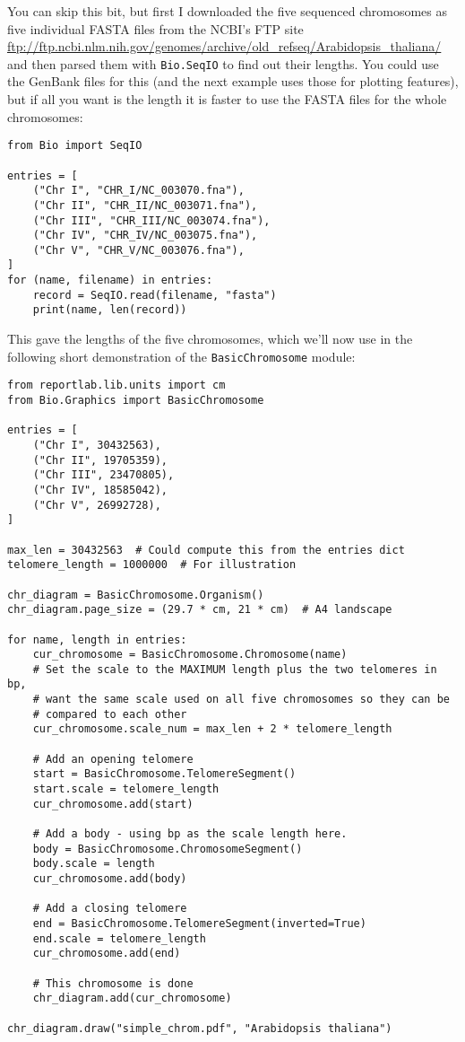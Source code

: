 You can skip this bit, but first I downloaded the five sequenced chromosomes
as five individual FASTA files from the NCBI's FTP site
\url{ftp://ftp.ncbi.nlm.nih.gov/genomes/archive/old_refseq/Arabidopsis_thaliana/}
and then parsed them with \verb|Bio.SeqIO| to find out their lengths.  You
could use the GenBank files for this (and the next example uses those for
plotting features), but if all you want is the length it is faster to use the
FASTA files for the whole chromosomes:

\begin{verbatim}
from Bio import SeqIO

entries = [
    ("Chr I", "CHR_I/NC_003070.fna"),
    ("Chr II", "CHR_II/NC_003071.fna"),
    ("Chr III", "CHR_III/NC_003074.fna"),
    ("Chr IV", "CHR_IV/NC_003075.fna"),
    ("Chr V", "CHR_V/NC_003076.fna"),
]
for (name, filename) in entries:
    record = SeqIO.read(filename, "fasta")
    print(name, len(record))
\end{verbatim}

\noindent This gave the lengths of the five chromosomes, which we'll now use in
the following short demonstration of the \verb|BasicChromosome| module:

\begin{verbatim}
from reportlab.lib.units import cm
from Bio.Graphics import BasicChromosome

entries = [
    ("Chr I", 30432563),
    ("Chr II", 19705359),
    ("Chr III", 23470805),
    ("Chr IV", 18585042),
    ("Chr V", 26992728),
]

max_len = 30432563  # Could compute this from the entries dict
telomere_length = 1000000  # For illustration

chr_diagram = BasicChromosome.Organism()
chr_diagram.page_size = (29.7 * cm, 21 * cm)  # A4 landscape

for name, length in entries:
    cur_chromosome = BasicChromosome.Chromosome(name)
    # Set the scale to the MAXIMUM length plus the two telomeres in bp,
    # want the same scale used on all five chromosomes so they can be
    # compared to each other
    cur_chromosome.scale_num = max_len + 2 * telomere_length

    # Add an opening telomere
    start = BasicChromosome.TelomereSegment()
    start.scale = telomere_length
    cur_chromosome.add(start)

    # Add a body - using bp as the scale length here.
    body = BasicChromosome.ChromosomeSegment()
    body.scale = length
    cur_chromosome.add(body)

    # Add a closing telomere
    end = BasicChromosome.TelomereSegment(inverted=True)
    end.scale = telomere_length
    cur_chromosome.add(end)

    # This chromosome is done
    chr_diagram.add(cur_chromosome)

chr_diagram.draw("simple_chrom.pdf", "Arabidopsis thaliana")
\end{verbatim}

